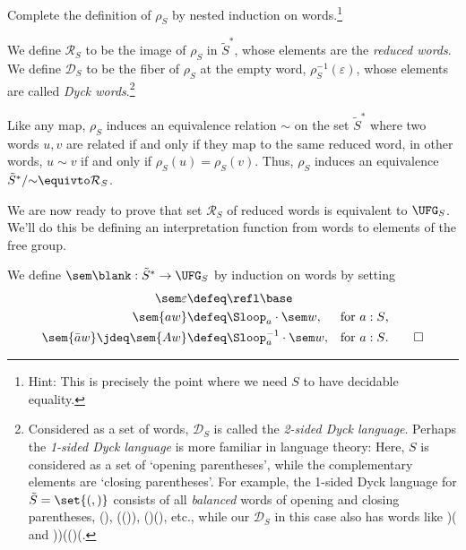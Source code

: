 \begin{xca}
  Complete the definition of $\rho_S$ by nested induction on words.\footnote{%
    Hint: This is precisely the point where we need $S$ to have decidable equality.}
\end{xca}

\begin{definition}
  We define $\mathcal R_S$ to be the image of $\rho_S$ in $\tilde S^*$,
  whose elements are the \emph{reduced words}.
  We define $\mathcal D_S$ to be the fiber of $\rho_S$ at the empty word,
  $\rho_S^{-1}(\varepsilon)$,
  whose elements are called \emph{Dyck words}.\footnote{%
    Considered as a set of words,
    $\mathcal D_S$ is called the \emph{2-sided Dyck language}.
    Perhaps the \emph{1-sided Dyck language} is more familiar
    in language theory: Here, $S$ is considered as a set of
    `opening parentheses', while the complementary elements
    are `closing parentheses'.
    For example, the 1-sided Dyck language for $\tilde S=\set{\textup{(},\textup{)}}$
    consists of all \emph{balanced} words of opening and closing parentheses,
    \eg (), (()), ()(), etc., while our $\mathcal D_S$ in this case
    also has words like )( and ))(()(.}
\end{definition}

\begin{remark}
  Like any map, $\rho_S$ induces an equivalence relation $\sim$
  on the set $\tilde S^*$
  where two words $u,v$ are related
  if and only if they map to the same reduced word,
  in other words,
  $u \sim v$ if and only if $\rho_S(u) = \rho_S(v)$.
  Thus, $\rho_S$ induces an equivalence $\tilde S^*/{\sim} \equivto \mathcal R_S$.
\end{remark}

We are now ready to prove that set $\mathcal R_S$ of reduced words
is equivalent to $\UFG_S$.
We'll do this be defining an interpretation function from words
to elements of the free group.

\begin{definition}
  We define $\sem\blank : \tilde S^* \to \UFG_S$
  by induction on words by setting
  \begin{align*}
    \sem\varepsilon             &\defeq \refl\base & & \\
    \sem{aw}                    &\defeq \Sloop_a \cdot \sem w,
                                &\text{for $a:S$,}& \\
    \sem{\bar aw}\jdeq \sem{Aw} &\defeq \Sloop_a^{-1} \cdot \sem w,
                                &\text{for $a:S$.}&\qedhere
  \end{align*}
\end{definition}

